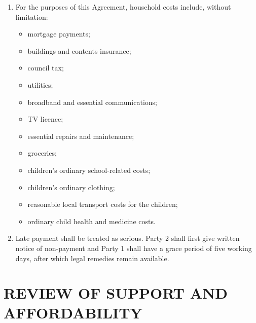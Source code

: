 \documentclass[10pt,a4paper]{article}
\begin{document}
\begin{enumerate}[label=\arabic*., start=27, leftmargin=1.8em]
    \item For the purposes of this Agreement, household costs include, without limitation:
    \begin{itemize}[leftmargin=1.8em]
        \item mortgage payments;
        \item buildings and contents insurance;
        \item council tax;
        \item utilities;
        \item broadband and essential communications;
        \item TV licence;
        \item essential repairs and maintenance;
        \item groceries;
        \item children's ordinary school-related costs;
        \item children's ordinary clothing;
        \item reasonable local transport costs for the children;
        \item ordinary child health and medicine costs.
    \end{itemize}
    \item Late payment shall be treated as serious. Party 2 shall first give written notice of non-payment and Party 1 shall have a grace period of five working days, after which legal remedies remain available.
\end{enumerate}

\section*{REVIEW OF SUPPORT AND AFFORDABILITY}
\end{document}

